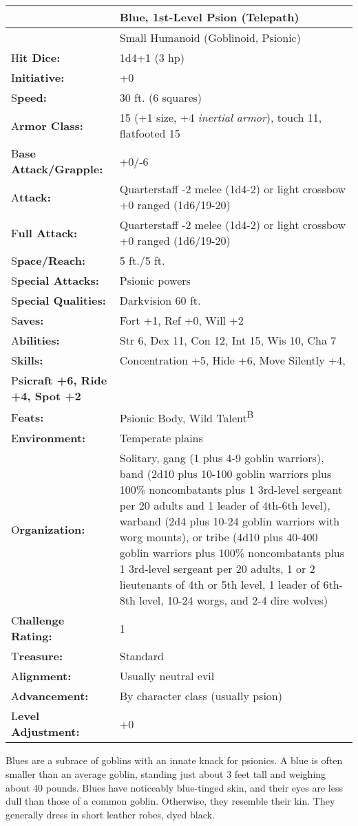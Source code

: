 \documentclass{article}
\begin{document}
\begin{tabular}{|>{\raggedright}p{80pt}|>{\raggedright}p{246pt}|}
\hline
  & Blue, 1st-Level Psion (Telepath)\tabularnewline
\hline
  & Small Humanoid (Goblinoid, Psionic)\tabularnewline
\hline
H\textbf{it Dice:} & 1d4+1 (3 hp)\tabularnewline
\hline
I\textbf{nitiative:} & +0\tabularnewline
\hline
S\textbf{peed:} & 30 ft. (6 squares)\tabularnewline
\hline
A\textbf{rmor Class:} & 15 (+1 size, +4 \textit{inertial armor}), touch 11, flatfooted 
15\tabularnewline
\hline
B\textbf{ase Attack/Grapple:} & +0/-6\tabularnewline
\hline
A\textbf{ttack:} & Quarterstaff -2 melee (1d4-2) or light crossbow +0 ranged (1d6/19-20)\tabularnewline
\hline
F\textbf{ull Attack:} & Quarterstaff -2 melee (1d4-2) or light crossbow +0 ranged 
(1d6/19-20)\tabularnewline
\hline
S\textbf{pace/Reach:} & 5 ft./5 ft.\tabularnewline
\hline
S\textbf{pecial Attacks:} & Psionic powers\tabularnewline
\hline
S\textbf{pecial Qualities:} & Darkvision 60 ft.\tabularnewline
\hline
S\textbf{aves:} & Fort +1, Ref +0, Will +2\tabularnewline
\hline
A\textbf{bilities:} & Str 6, Dex 11, Con 12, Int 15, Wis 10, Cha 7\tabularnewline
\hline
S\textbf{kills:} & Concentration +5, Hide +6, Move Silently +4,\tabularnewline
\hline
P\textbf{sicraft +6, Ride +4, Spot +2} & \tabularnewline
\hline
F\textbf{eats:} & Psionic Body, Wild Talent\textsuperscript{B}\tabularnewline
\hline
E\textbf{nvironment:} & Temperate plains\tabularnewline
\hline
O\textbf{rganization:} & Solitary, gang (1 plus 4-9 goblin warriors), band (2d10 
plus 10-100 goblin warriors plus 100\% noncombatants plus 1 3rd-level sergeant 
per 20 adults and 1 leader of 4th-6th level), warband (2d4 plus 10-24 goblin warriors 
with worg mounts), or tribe (4d10 plus 40-400 goblin warriors plus 100\% noncombatants 
plus 1 3rd-level sergeant per 20 adults, 1 or 2 lieutenants of 4th or 5th level, 
1 leader of 6th-8th level, 10-24 worgs, and 2-4 dire wolves)\tabularnewline
\hline
C\textbf{hallenge Rating:} & 1\tabularnewline
\hline
T\textbf{reasure:} & Standard\tabularnewline
\hline
A\textbf{lignment:} & Usually neutral evil\tabularnewline
\hline
A\textbf{dvancement:} & By character class (usually psion)\tabularnewline
\hline
L\textbf{evel Adjustment:} & +0\tabularnewline
\hline
\end{tabular}

Blues are a subrace of goblins with an innate knack for psionics. A blue is often 
smaller than an average goblin, standing just about 3 feet tall and weighing about 
40 pounds. Blues have noticeably blue-tinged skin, and their eyes are less dull 
than those of a common goblin. Otherwise, they resemble their kin. They generally 
dress in short leather robes, dyed black.
\end{document}
